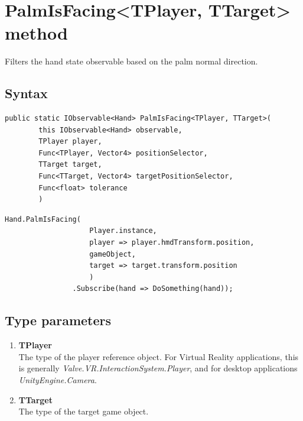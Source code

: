 \documentclass[12pt,a4paper,twoside]{report}
\begin{document}
\section{PalmIsFacing<TPlayer, TTarget> method}
Filters the hand state observable based on the palm normal direction.

\subsection{Syntax}
\begin{lstlisting}[caption=Declaration]
    public static IObservable<Hand> PalmIsFacing<TPlayer, TTarget>(
        this IObservable<Hand> observable,
        TPlayer player,
        Func<TPlayer, Vector4> positionSelector,
        TTarget target,
        Func<TTarget, Vector4> targetPositionSelector,
        Func<float> tolerance
        )
\end{lstlisting}
\begin{lstlisting}[caption=Usage example]
    Hand.PalmIsFacing(
                    Player.instance,
                    player => player.hmdTransform.position,
                    gameObject,
                    target => target.transform.position
                    )
                .Subscribe(hand => DoSomething(hand));
\end{lstlisting}

\subsection{Type parameters}
\begin{enumerate}
    \item \textbf{TPlayer}\\
        The type of the player reference object. For Virtual Reality applications, this is generally \textit{Valve.VR.InteractionSystem.Player}, and for desktop applications \textit{UnityEngine.Camera}.
        
    \item \textbf{TTarget}\\
        The type of the target game object.
\end{enumerate}
\end{document}
